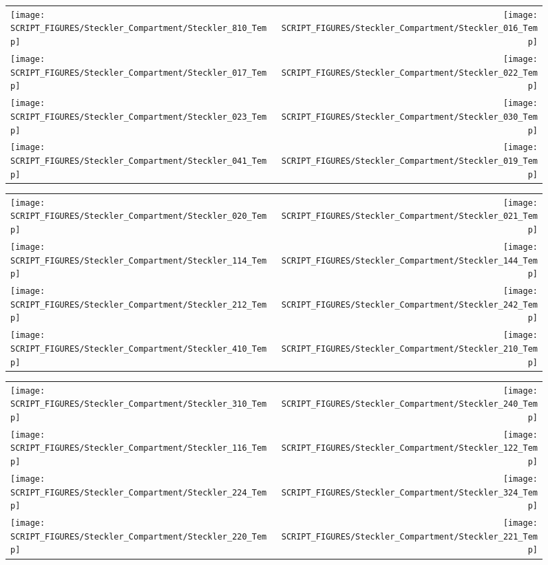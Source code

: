 \begin{figure}[!ht]
\begin{tabular*}{\textwidth}{l@{\extracolsep{\fill}}r}
\texttt{[image: SCRIPT\_FIGURES/Steckler\_Compartment/Steckler\_810\_Temp]} &
\texttt{[image: SCRIPT\_FIGURES/Steckler\_Compartment/Steckler\_016\_Temp]} \\
\texttt{[image: SCRIPT\_FIGURES/Steckler\_Compartment/Steckler\_017\_Temp]} &
\texttt{[image: SCRIPT\_FIGURES/Steckler\_Compartment/Steckler\_022\_Temp]} \\
\texttt{[image: SCRIPT\_FIGURES/Steckler\_Compartment/Steckler\_023\_Temp]} &
\texttt{[image: SCRIPT\_FIGURES/Steckler\_Compartment/Steckler\_030\_Temp]} \\
\texttt{[image: SCRIPT\_FIGURES/Steckler\_Compartment/Steckler\_041\_Temp]} &
\texttt{[image: SCRIPT\_FIGURES/Steckler\_Compartment/Steckler\_019\_Temp]}
\end{tabular*}
\end{figure}

\begin{figure}[!ht]
\begin{tabular*}{\textwidth}{l@{\extracolsep{\fill}}r}
\texttt{[image: SCRIPT\_FIGURES/Steckler\_Compartment/Steckler\_020\_Temp]} &
\texttt{[image: SCRIPT\_FIGURES/Steckler\_Compartment/Steckler\_021\_Temp]} \\
\texttt{[image: SCRIPT\_FIGURES/Steckler\_Compartment/Steckler\_114\_Temp]} &
\texttt{[image: SCRIPT\_FIGURES/Steckler\_Compartment/Steckler\_144\_Temp]} \\
\texttt{[image: SCRIPT\_FIGURES/Steckler\_Compartment/Steckler\_212\_Temp]} &
\texttt{[image: SCRIPT\_FIGURES/Steckler\_Compartment/Steckler\_242\_Temp]} \\
\texttt{[image: SCRIPT\_FIGURES/Steckler\_Compartment/Steckler\_410\_Temp]} &
\texttt{[image: SCRIPT\_FIGURES/Steckler\_Compartment/Steckler\_210\_Temp]}
\end{tabular*}
\end{figure}

\begin{figure}[!ht]
\begin{tabular*}{\textwidth}{l@{\extracolsep{\fill}}r}
\texttt{[image: SCRIPT\_FIGURES/Steckler\_Compartment/Steckler\_310\_Temp]} &
\texttt{[image: SCRIPT\_FIGURES/Steckler\_Compartment/Steckler\_240\_Temp]} \\
\texttt{[image: SCRIPT\_FIGURES/Steckler\_Compartment/Steckler\_116\_Temp]} &
\texttt{[image: SCRIPT\_FIGURES/Steckler\_Compartment/Steckler\_122\_Temp]} \\
\texttt{[image: SCRIPT\_FIGURES/Steckler\_Compartment/Steckler\_224\_Temp]} &
\texttt{[image: SCRIPT\_FIGURES/Steckler\_Compartment/Steckler\_324\_Temp]} \\
\texttt{[image: SCRIPT\_FIGURES/Steckler\_Compartment/Steckler\_220\_Temp]} &
\texttt{[image: SCRIPT\_FIGURES/Steckler\_Compartment/Steckler\_221\_Temp]}
\end{tabular*}
\end{figure}

